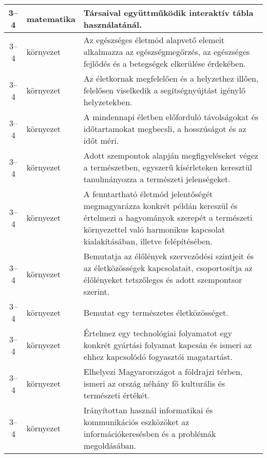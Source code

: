 \begin{small}
\begin{longtable}{c | p{2cm} |  p{11cm} }
              3--4 & matematika & Társaival együttműködik interaktív tábla használatánál. \\ \hline
              3--4 & környezet & Az egészséges életmód alapvető elemeit alkalmazza az egészségmegőrzés, az egészséges fejlődés és a betegségek elkerülése érdekében. \\ \hline
              3--4 & környezet & Az életkornak megfelelően és a helyzethez illően, felelősen viselkedik a segítségnyújtást igénylő helyzetekben. \\ \hline
              3--4 & környezet & A mindennapi életben előforduló távolságokat és időtartamokat megbecsli, a hosszúságot és az időt méri. \\ \hline
              3--4 & környezet & Adott szempontok alapján megfigyeléseket végez a természetben, egyszerű kísérleteken keresztül tanulmányozza a természeti jelenségeket. \\ \hline
              3--4 & környezet & A fenntartható életmód jelentőségét megmagyarázza konkrét példán kereszül és értelmezi a hagyományok szerepét a természeti környezettel való harmonikus kapcsolat kialakításában, illetve felépítésében. \\ \hline
              3--4 & környezet & Bemutatja az élőlények szerveződési szintjeit és az életközösségek kapcsolatait, csoportosítja az élőlényeket tetszőleges és adott szempontsor szerint. \\ \hline
              3--4 & környezet & Bemutat egy természetes életközösséget. \\ \hline
              3--4 & környezet & Értelmez egy technológiai folyamatot egy konkrét gyártási folyamat kapcsán és ismeri az ehhez kapcsolódó fogyasztói magatartást. \\ \hline
              3--4 & környezet & Elhelyezi Magyarországot a földrajzi térben, ismeri az ország néhány fő kulturális és természeti értékét. \\ \hline
              3--4 & környezet & Irányítottan használ informatikai és kommunikációs eszközöket az információkeresésben és a problémák megoldásában. \\ \hline
      \end{longtable}
\end{small}


